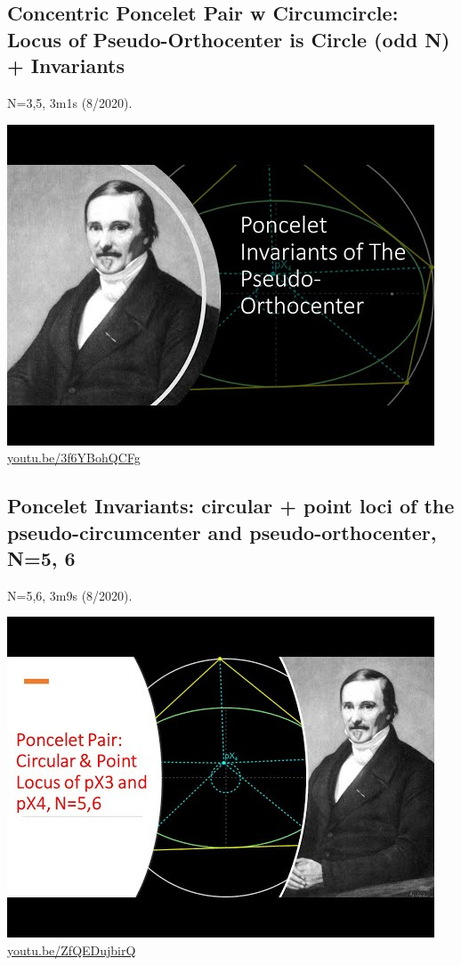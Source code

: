 \documentclass[12pt]{amsart}
\begin{document}
\subsection{Concentric Poncelet Pair w Circumcircle: Locus of Pseudo-Orthocenter is Circle (odd N) + Invariants}
\label{vid:3f6YBohQCFg}
\noindent N=3,5, 3m1s (8/2020). 
\begin{center}\includegraphics[width=.5\textwidth]{pics/3f6YBohQCFg.jpg} \\ 
\href{https://youtu.be/3f6YBohQCFg}{\url{youtu.be/3f6YBohQCFg}}\end{center}
% 

\subsection{Poncelet Invariants:
circular + point loci of the pseudo-circumcenter and pseudo-orthocenter, N=5, 6}
\label{vid:ZfQEDujbirQ}
\noindent N=5,6, 3m9s (8/2020). 
\begin{center}\includegraphics[width=.5\textwidth]{pics/ZfQEDujbirQ.jpg} \\ 
\href{https://youtu.be/ZfQEDujbirQ}{\url{youtu.be/ZfQEDujbirQ}}\end{center}
% 
\end{document}
